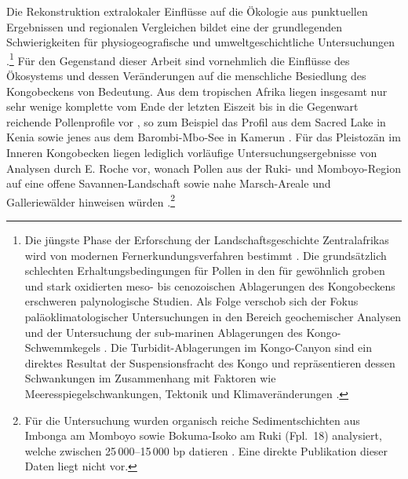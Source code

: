 Die Rekonstruktion extralokaler Einflüsse auf die Ökologie aus punktuellen Ergebnissen und regionalen Vergleichen bildet eine der grundlegenden Schwierigkeiten für physiogeografische und umweltgeschichtliche Untersuchungen \parencite[42]{Sangen.2009}.\footnote{Die jüngste Phase der Erforschung der Landschaftsgeschichte Zentralafrikas wird von modernen Fernerkundungsverfahren bestimmt \parencite[6]{Runge.2001}. Die grundsätzlich schlechten Erhaltungsbedingungen für Pollen in den für gewöhnlich groben und stark oxidierten meso- bis cenozoischen Ablagerungen des Kongobeckens erschweren palynologische Studien. Als Folge verschob sich der Fokus paläoklimatologischer Untersuchungen in den Bereich geochemischer Analysen und der Untersuchung der sub-marinen Ablagerungen des Kongo-Schwemmkegels \parencite[312]{Giresse.2005b}. Die Turbidit-Ablagerungen im Kongo-Canyon sind ein direktes Resultat der Suspensionsfracht des Kongo und repräsentieren dessen Schwankungen im Zusammenhang mit Faktoren wie Meeresspiegelschwankungen, Tektonik und Klimaveränderungen \parencite[2176]{Savoye.2009}.} Für den Gegenstand dieser Arbeit sind vornehmlich die Einflüsse des Ökosystems und dessen Veränderungen auf die menschliche Besiedlung des Kongobeckens von Bedeutung. Aus dem tropischen Afrika liegen insgesamt nur sehr wenige komplette vom Ende der letzten Eiszeit bis in die Gegenwart reichende Pollenprofile vor \parencite[2682]{Lezine.2013}, so zum Beispiel das Profil aus dem Sacred Lake in Kenia \parencite[65--73; Beilage Fig.~15]{Coetzee.1967} sowie jenes aus dem Barombi-Mbo-See in Kamerun \parencite{Maley.1991}. Für das Pleistozän im Inneren Kongobecken liegen lediglich vorläufige Untersuchungsergebnisse von Analysen durch E. Roche vor, wonach Pollen aus der Ruki- und Momboyo-Region auf eine offene Savannen-Landschaft sowie nahe Marsch-Areale und Galleriewälder hinweisen würden \parencite[181]{Fiedler.1985}.\footnote{Für die Untersuchung wurden organisch reiche Sedimentschichten aus Imbonga am Momboyo \parencite[siehe][542f. Karte~1 Fpl.~43]{Wotzka.1995} sowie Bokuma-Isoko am Ruki (Fpl.~18) analysiert, welche zwischen 25\,000--15\,000 bp datieren \parencite[182]{Fiedler.1985}. Eine direkte Publikation dieser Daten liegt nicht vor.}

